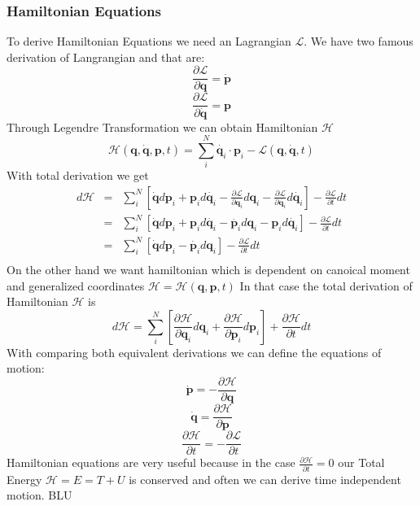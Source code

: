 \subsubsection{Hamiltonian Equations}
To derive Hamiltonian Equations we need an Lagrangian $\mathcal{L}$.
We have two famous derivation of Langrangian and that are:
\begin{equation}
	\frac{\partial\mathcal{L}}{\partial \mathbf{q}} = \dot{\mathbf{p}}
\end{equation}
\begin{equation}
	\frac{\partial\mathcal{L}}{\partial \dot{\mathbf{q}}} = \mathbf{p}
\end{equation}
Through Legendre Transformation we can obtain Hamiltonian $\mathcal{H}$
\begin{equation}
	\mathcal{H}(\mathbf{q},\dot{\mathbf{q}},\mathbf{p},t) = \sum_i^N  \dot{\mathbf{q}_i} \cdot \mathbf{p}_i -\mathcal{L}(\mathbf{q},\dot{\mathbf{q}},t)
\end{equation}
With total derivation\cite{ham} we get
\begin{eqnarray}
	d\mathcal{H} &=& \sum_i^N\left[ \dot{\mathbf{q}} d\mathbf{p}_i +  \mathbf{p}_i d\dot{\mathbf{q}_i} - \frac{\partial\mathcal{L}}{\partial \mathbf{q}_i} d\mathbf{q}_i - \frac{\partial\mathcal{L}}{\partial \dot{\mathbf{q}_i}} d\dot{\mathbf{q}_i}\right] - \frac{\partial\mathcal{L}}{\partial t} dt\\ 
	&=& \sum_i^N\left[ \dot{\mathbf{q}} d\mathbf{p}_i +  \mathbf{p}_i d\dot{\mathbf{q}_i} - \dot{\mathbf{p}_i} d\mathbf{q}_i - \mathbf{p}_i d\dot{\mathbf{q}_i}\right] - \frac{\partial\mathcal{L}}{\partial t} dt\\
	&=&\sum_i^N\left[ \dot{\mathbf{q}} d\mathbf{p}_i  - \dot{\mathbf{p}_i} d\mathbf{q}_i\right] - \frac{\partial\mathcal{L}}{\partial t} dt\\
\end{eqnarray}
On the other hand we want hamiltonian which is dependent on canoical moment and generalized coordinates $\mathcal{H}=\mathcal{H}(\mathbf{q},\mathbf{p},t)$
In that case the total derivation of Hamiltonian $\mathcal{H}$ is
\begin{equation}
	d\mathcal{H} = \sum_i^N\left[\frac{\partial \mathcal{H}}{\partial \mathbf{q}_i}d\mathbf{q}_i + \frac{\partial \mathcal{H}}{\partial \mathbf{p}_i}d\mathbf{p}_i\right] + \frac{\partial\mathcal{H}}{\partial t} dt
\end{equation}
With comparing both equivalent derivations we can define the equations of motion:
\begin{equation}
	\dot{\mathbf{p}} = -\frac{\partial \mathcal{H}}{\partial \mathbf{q}}
\end{equation}
\begin{equation}
	\dot{\mathbf{q}} = \frac{\partial \mathcal{H}}{\partial \mathbf{p}}
\end{equation}
\begin{equation}
	\frac{\partial\mathcal{H}}{\partial t} = - \frac{\partial\mathcal{L}}{\partial t}
\end{equation}
Hamiltonian equations are very useful because in the case $\frac{\partial\mathcal{H}}{\partial t} = 0$ our Total Energy $\mathcal{H} = E = T + U$ is conserved and often we can derive time independent motion. BLU
